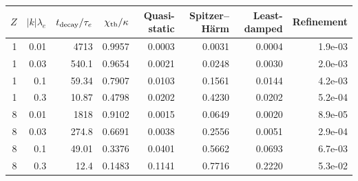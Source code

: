 \begin{tabular}{rrrrrrrr}\toprule
$Z$ & $|k|\lambda_e$ & $t_{\rm decay}/\tau_e$ & $\chi_{\rm th}/\kappa$ & Quasi-static & Spitzer--H\"arm & Least-damped & Refinement\\\midrule
1 & 0.01 & 4713 & 0.9957 & 0.0003 & 0.0031 & 0.0004 & 1.9e-03 \\
1 & 0.03 & 540.1 & 0.9654 & 0.0021 & 0.0248 & 0.0030 & 2.0e-03 \\
1 & 0.1 & 59.34 & 0.7907 & 0.0103 & 0.1561 & 0.0144 & 4.2e-03 \\
1 & 0.3 & 10.87 & 0.4798 & 0.0202 & 0.4230 & 0.0202 & 5.2e-04 \\
8 & 0.01 & 1818 & 0.9102 & 0.0015 & 0.0649 & 0.0020 & 8.9e-05 \\
8 & 0.03 & 274.8 & 0.6691 & 0.0038 & 0.2556 & 0.0051 & 2.9e-04 \\
8 & 0.1 & 49.01 & 0.3376 & 0.0401 & 0.5662 & 0.0693 & 6.7e-03 \\
8 & 0.3 & 12.4 & 0.1483 & 0.1141 & 0.7716 & 0.2220 & 5.3e-02 \\
\bottomrule\end{tabular}
